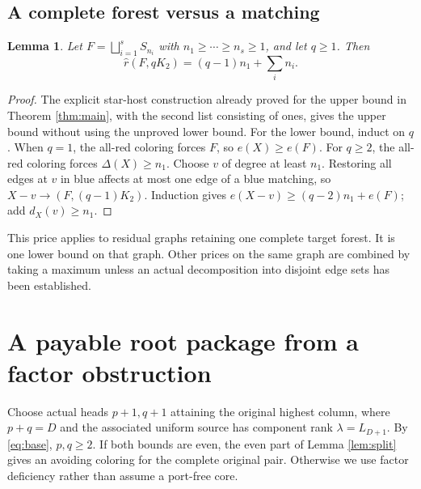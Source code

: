 \documentclass[11pt,a4paper]{article}
\newcommand{\rh}{\widehat r}
\newcommand{\sq}{\bigsqcup}
\newtheorem{lemma}[theorem]{Lemma}
\theoremstyle{definition}
\begin{document}
\subsection{A complete forest versus a matching}
\begin{lemma}\label{lem:endpoint}
Let $F=\sq_{i=1}^{s}S_{n_i}$ with $n_1\ge\cdots\ge n_s\ge1$, and let $q\ge1$. Then
\begin{equation}\label{eq:endpoint}
\rh(F,qK_2)=(q-1)n_1+\sum_i n_i.
\end{equation}
\end{lemma}
\begin{proof}
The explicit star-host construction already proved for the upper bound in Theorem \ref{thm:main}, with the second list consisting of ones, gives the upper bound without using the unproved lower bound.
For the lower bound, induct on $q$. When $q=1$, the all-red coloring forces $F$, so $e(X)\ge e(F)$. For $q\ge2$, the all-red coloring forces $\Delta(X)\ge n_1$. Choose $v$ of degree at least $n_1$. Restoring all edges at $v$ in blue affects at most one edge of a blue matching, so
$X-v\to(F,(q-1)K_2)$. Induction gives
$e(X-v)\ge(q-2)n_1+e(F)$; add $d_X(v)\ge n_1$.
\end{proof}
This price applies to residual graphs retaining one complete target forest. It is one lower bound on that graph. Other prices on the same graph are combined by taking a maximum unless an actual decomposition into disjoint edge sets has been established.


\section{A payable root package from a factor obstruction}\label{sec:fractional}
Choose actual heads $p+1,q+1$ attaining the original highest column, where $p+q=D$ and the associated uniform source has component rank $\lambda=L_{D+1}$. By \eqref{eq:base}, $p,q\ge2$. If both bounds are even, the even part of Lemma \ref{lem:split} gives an avoiding coloring for the complete original pair. Otherwise we use factor deficiency rather than assume a port-free core.
\end{document}
